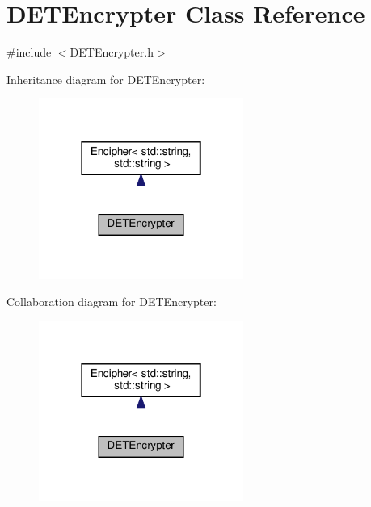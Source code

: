 \hypertarget{classDETEncrypter}{}\section{D\+E\+T\+Encrypter Class Reference}
\label{classDETEncrypter}


{\ttfamily \#include $<$D\+E\+T\+Encrypter.\+h$>$}



Inheritance diagram for D\+E\+T\+Encrypter\+:\nopagebreak
\begin{figure}[H]
\begin{center}
\leavevmode
\includegraphics[width=190pt]{classDETEncrypter__inherit__graph}
\end{center}
\end{figure}


Collaboration diagram for D\+E\+T\+Encrypter\+:\nopagebreak
\begin{figure}[H]
\begin{center}
\leavevmode
\includegraphics[width=190pt]{classDETEncrypter__coll__graph}
\end{center}
\end{figure}

